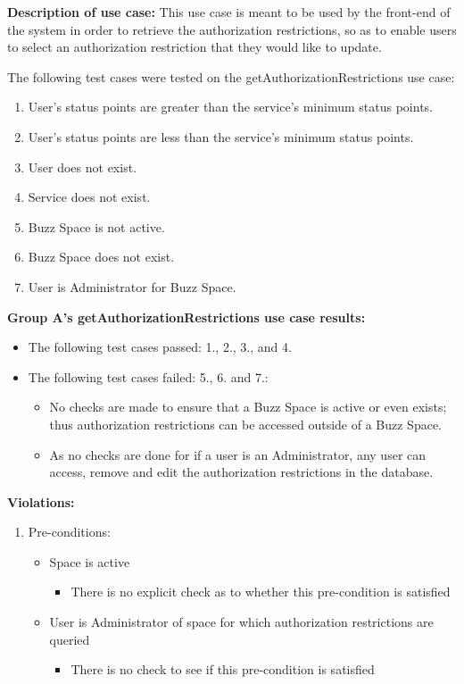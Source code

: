 \textbf{Description of use case:}\newline
This use case is meant to be used by the front-end of the system in order to retrieve the authorization restrictions, so as to enable users to select an authorization restriction that they would like to update.
\medskip

\medskip

\noindent
The following test cases were tested on the getAuthorizationRestrictions use case:
\begin{enumerate}
	\item User's status points are greater than the service's minimum status points.
	\item User's status points are less than the service's minimum status points.
	\item User does not exist.
  	\item Service does not exist.
  	\item Buzz Space is not active.
  	\item Buzz Space does not exist.
  	\item User is Administrator for Buzz Space.
\end{enumerate}
\medskip

\noindent
\textbf{Group A's getAuthorizationRestrictions use case results:}\newline

\begin{itemize}
\item The following test cases passed: 1., 2., 3., and 4.
\item The following test cases failed: 5., 6. and 7.:
	\begin{itemize}
		\item No checks are made to ensure that a Buzz Space is active or even exists; thus authorization restrictions can be accessed outside of a Buzz Space.
		\item As no checks are done for if a user is an Administrator, any user can access, remove and edit the authorization restrictions in the database.
	\end{itemize}
	
\end{itemize}
\medskip

\noindent
\textbf{Violations:}
\begin{enumerate}
	\item Pre-conditions:	
	\begin{itemize}
		\item Space is active
		\begin{itemize}
				\item There is no explicit check as to whether this pre-condition is satisfied
		\end{itemize}
		\item User is Administrator of space for which authorization restrictions are queried
		\begin{itemize}
				\item There is no check to see if this pre-condition is satisfied
		\end{itemize}
	\end{itemize}
\end{enumerate}	
\medskip

